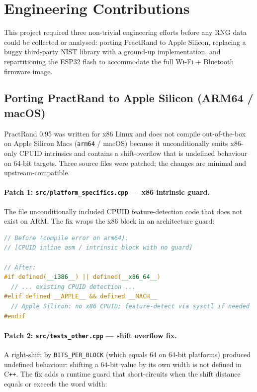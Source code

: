 \documentclass[10pt,twocolumn]{article}
\begin{document}
\section{Engineering Contributions}

This project required three non-trivial engineering efforts before any
RNG data could be collected or analysed: porting PractRand to Apple
Silicon, replacing a buggy third-party NIST library with a ground-up
implementation, and repartitioning the ESP32 flash to accommodate the
full Wi-Fi + Bluetooth firmware image.

\subsection{Porting PractRand to Apple Silicon (ARM64 / macOS)}
\label{sec:practrand-port}

PractRand 0.95 was written for x86 Linux and does not compile
out-of-the-box on Apple Silicon Macs (\texttt{arm64} / macOS) because it
unconditionally emits x86-only CPUID intrinsics and contains a
shift-overflow that is undefined behaviour on 64-bit targets.
Three source files were patched; the changes are minimal and
upstream-compatible.

\paragraph{Patch 1: \texttt{src/platform\_specifics.cpp} --- x86 intrinsic guard.}
The file unconditionally included CPUID feature-detection code that
does not exist on ARM.
The fix wraps the x86 block in an architecture guard:

\begin{lstlisting}[language=C++,caption={platform\_specifics.cpp --- guard added around x86 CPUID block}]
// Before (compile error on arm64):
// [CPUID inline asm / intrinsic block with no guard]

// After:
#if defined(__i386__) || defined(__x86_64__)
  // ... existing CPUID detection ...
#elif defined __APPLE__ && defined __MACH__
  // Apple Silicon: no x86 CPUID; feature-detect via sysctl if needed
#endif
\end{lstlisting}

\paragraph{Patch 2: \texttt{src/tests\_other.cpp} --- shift overflow fix.}
A right-shift by \texttt{BITS\_PER\_BLOCK} (which equals 64 on 64-bit
platforms) produced undefined behaviour: shifting a 64-bit value by its
own width is not defined in C\texttt{++}.
The fix adds a runtime guard that short-circuits when the shift
distance equals or exceeds the word width:
\end{document}
